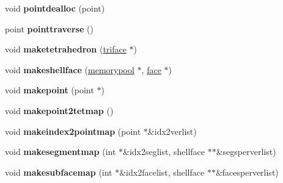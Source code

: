 \begin{DoxyCompactItemize}
\item 
\mbox{\label{classStemMesh3D_1_1tetgenmesh_a4e218d29d2545cff0774af11105b0372}} 
void {\bfseries pointdealloc} (point)
\item 
\mbox{\label{classStemMesh3D_1_1tetgenmesh_ad7e5dc98b0dbb9981482a68be62ed029}} 
point {\bfseries pointtraverse} ()
\item 
\mbox{\label{classStemMesh3D_1_1tetgenmesh_ad46992e25a107f0f6af28cd84fe5b174}} 
void {\bfseries maketetrahedron} (\hyperlink{classStemMesh3D_1_1tetgenmesh_1_1triface}{triface} $\ast$)
\item 
\mbox{\label{classStemMesh3D_1_1tetgenmesh_ac6f12a4ad138f2a3873588ee06b3c536}} 
void {\bfseries makeshellface} (\hyperlink{classStemMesh3D_1_1tetgenmesh_1_1memorypool}{memorypool} $\ast$, \hyperlink{classStemMesh3D_1_1tetgenmesh_1_1face}{face} $\ast$)
\item 
\mbox{\label{classStemMesh3D_1_1tetgenmesh_afa5d65db68ca464a42e04044d982dca2}} 
void {\bfseries makepoint} (point $\ast$)
\item 
\mbox{\label{classStemMesh3D_1_1tetgenmesh_af6bf858a28a7e77dd115e3bd06c124c2}} 
void {\bfseries makepoint2tetmap} ()
\item 
\mbox{\label{classStemMesh3D_1_1tetgenmesh_a315738d95475d61c009b1ab347b8416e}} 
void {\bfseries makeindex2pointmap} (point $\ast$\&idx2verlist)
\item 
\mbox{\label{classStemMesh3D_1_1tetgenmesh_a246d943c65bb5339fb3967358f46f050}} 
void {\bfseries makesegmentmap} (int $\ast$\&idx2seglist, shellface $\ast$$\ast$\&segsperverlist)
\item 
\mbox{\label{classStemMesh3D_1_1tetgenmesh_a84a4ad9694f9adbf21dcbae4d9dbefd2}} 
void {\bfseries makesubfacemap} (int $\ast$\&idx2facelist, shellface $\ast$$\ast$\&facesperverlist)
\item 
\mbox{\label{classStemMesh3D_1_1tetgenmesh_a4307aac403503edec609cede4856ad7c}} 

\end{DoxyCompactItemize}
